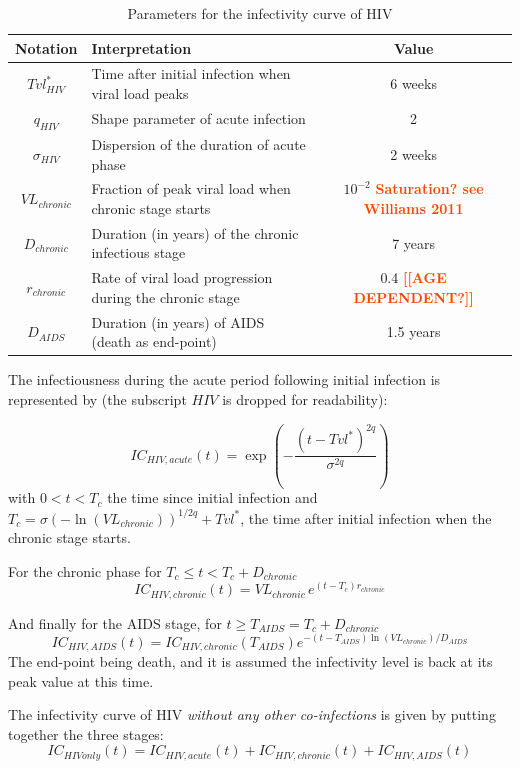 \documentclass[11pt, onecolumn]{article}
\newcommand{\warning}[1]{\textbf{\textcolor{OrangeRed}{#1}}}
\begin{document}
\begin{table}[htdp]
\caption{Parameters for the infectivity curve of HIV}
\begin{center}
\begin{tabular}{clc}
\hline
\textbf{Notation} & \textbf{Interpretation} & \textbf{Value} \\
\hline
\hline
$Tvl^*_{HIV}$ & Time after initial infection when viral load peaks & 6 weeks\\
$q_{HIV}$ & Shape parameter of acute infection & 2 \\
$\sigma_{HIV}$ & Dispersion of the duration of acute phase & 2 weeks \\
$VL_{chronic}$ & Fraction of peak viral load when chronic stage starts  & $10^{-2}$ \warning{Saturation? see Williams 2011}\\
$D_{chronic}$ & Duration (in years) of the chronic infectious stage & 7 years \\
$r_{chronic}$ & Rate of viral load progression during the chronic stage & 0.4 \warning{[[AGE DEPENDENT?]]}\\
$D_{AIDS}$ & Duration (in years) of AIDS (death as end-point) & 1.5 years \\
\hline
\end{tabular}
\end{center}
\label{table:ICHIV}
\end{table}

The infectiousness during the acute period following initial infection is represented by (the subscript $HIV$ is dropped for readability):

$$IC_{HIV,acute}(t) = \exp\left( -\frac{(t-Tvl^*)^{2q}}{\sigma^{2q}} \right)$$
with $ 0<t<T_c$ the time since initial infection and $T_c = \sigma (-\ln(VL_{chronic}))^{1/2q} + Tvl^*$, the time after initial infection when the chronic stage starts.

For the chronic phase for $T_c\leq t < T_c+D_{chronic}$
$$ IC_{HIV,chronic}(t) = VL_{chronic} \, e^{(t-T_c)r_{chronic}} $$

And finally for the AIDS stage, for $ t \geq T_{AIDS}= T_c+D_{chronic}$
$$IC_{HIV,AIDS}(t) = IC_{HIV,chronic}(T_{AIDS}) e^{-(t-T_{AIDS}) \ln(VL_{chronic})/D_{AIDS}}$$
The end-point being death, and it is assumed the infectivity level is back at its peak value at this time.

The infectivity curve of HIV \emph{without any other co-infections} is given by putting together the three stages:
$$ IC_{HIVonly}(t) = IC_{HIV,acute}(t)+IC_{HIV,chronic}(t)+IC_{HIV,AIDS}(t)$$
\end{document}
